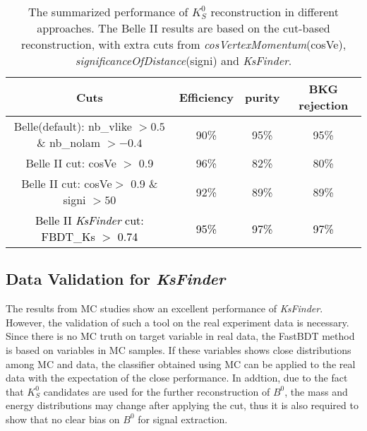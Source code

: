 \begin{table}
	\small
	\caption{The summarized performance of $K_S^0$ reconstruction in different approaches. The Belle II results are based on the cut-based reconstruction, with extra cuts from \textit{cosVertexMomentum}(cosVe), \textit{significanceOfDistance}(signi) and \textit{KsFinder}. }
	\label{tab:ksperf}
	\begin{tabular}{c|c|c|c} 
		\hline
		Cuts &  Efficiency & purity & BKG rejection\\
		\hline
		Belle(default): nb\_vlike $>0.5$ \& nb\_nolam $> -0.4$ & 90\% & 95\% & 95\% \\
		Belle II cut: cosVe $>$ 0.9 & 96\% & 82\% & 80\% \\
		Belle II cut: cosVe$>$ 0.9 \& signi $>50$ & 92\% & 89\% & 89\% \\
		\textcolor{black}{Belle II \textit{KsFinder} cut: FBDT\_Ks $>$ 0.74} & \textcolor{black}{95\%} & \textcolor{black}{97\%}  & \textcolor{black}{97\%} \\
		\hline
	\end{tabular}
\end{table}

\subsection{Data Validation for \textit{KsFinder}}
The results from MC studies show an excellent performance of \textit{KsFinder}. However, the validation of such a tool on the real experiment data is necessary. Since there is no MC truth on target variable in real data, the FastBDT method is based on variables in MC samples. If these variables shows close distributions among MC and data, the classifier obtained using MC can be applied to the real data with the expectation of the close performance.
In addtion, due to the fact that $K_S^0$ candidates are used for the further reconstruction of $B^0$, the  mass and energy distributions may change after applying the cut, thus it is also required to show that no clear bias on $B^0$ for signal extraction.


